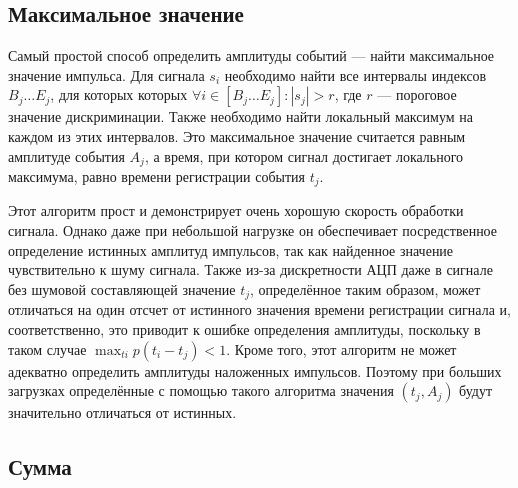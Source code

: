 
\subsection{Максимальное значение}

Самый простой способ определить амплитуды событий --- найти максимальное значение импульса. Для сигнала $s_i$ необходимо найти все интервалы индексов $B_j \ldots E_j$, для которых которых $\forall i \in \left[ B_j \ldots E_j \right]: |s_j| > r$, где $r$ --- пороговое значение дискриминации. Также необходимо найти локальный максимум на каждом из этих интервалов. Это максимальное значение считается равным амплитуде события $A_j$, а время, при котором сигнал достигает локального максимума, равно времени регистрации события $t_j$.

Этот алгоритм прост и демонстрирует очень хорошую скорость обработки сигнала. Однако даже при небольшой нагрузке он обеспечивает посредственное определение истинных амплитуд импульсов, так как найденное значение чувствительно к шуму сигнала. Также из-за дискретности АЦП даже в сигнале без шумовой составляющей значение $t_j$, определённое таким образом, может отличаться на один отсчет от истинного значения времени регистрации сигнала и, соответственно, это приводит к ошибке определения амплитуды, поскольку в таком случае $ \max_{ti} p(t_i - t_j ) < 1 $. Кроме того, этот алгоритм не может адекватно определить амплитуды наложенных импульсов. Поэтому при больших загрузках определённые с помощью такого алгоритма значения $(t_j, A_j)$ будут значительно отличаться от истинных.~\cite{Khilkevitch2020}


\subsection{Сумма}
\label{sec:ProcessingSum}

